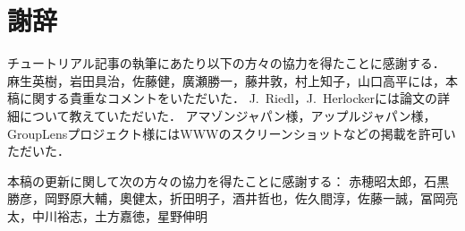 \chapter*{謝辞}
\label{sec:acknowledgment}

チュートリアル記事の執筆にあたり以下の方々の協力を得たことに感謝する．
麻生英樹，岩田具治，佐藤健，廣瀬勝一，藤井敦，村上知子，山口高平には，本稿に関する貴重なコメントをいただいた．
J.~Riedl，J.~Herlockerには論文の詳細について教えていただいた．
アマゾンジャパン様，アップルジャパン様，GroupLensプロジェクト様にはWWWのスクリーンショットなどの掲載を許可いただいた．

本稿の更新に関して次の方々の協力を得たことに感謝する：
赤穂昭太郎，石黒勝彦，岡野原大輔，奧健太，折田明子，酒井哲也，佐久間淳，佐藤一誠，冨岡亮太，中川裕志，土方嘉徳，星野伸明
